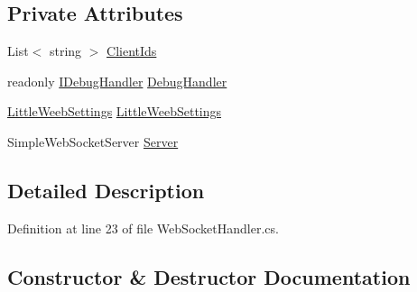 \subsection*{Private Attributes}
\begin{DoxyCompactItemize}
\item 
List$<$ string $>$ \mbox{\hyperlink{class_little_weeb_library_1_1_handlers_1_1_web_socket_handler_a019d083f8ea9b7ad625222d2311c5b26}{Client\+Ids}}
\item 
readonly \mbox{\hyperlink{interface_little_weeb_library_1_1_handlers_1_1_i_debug_handler}{I\+Debug\+Handler}} \mbox{\hyperlink{class_little_weeb_library_1_1_handlers_1_1_web_socket_handler_aa1474285fe938f284633c31403bf9edf}{Debug\+Handler}}
\item 
\mbox{\hyperlink{class_little_weeb_library_1_1_settings_1_1_little_weeb_settings}{Little\+Weeb\+Settings}} \mbox{\hyperlink{class_little_weeb_library_1_1_handlers_1_1_web_socket_handler_ace78703e1e323bb96f1f6941b7483a88}{Little\+Weeb\+Settings}}
\item 
Simple\+Web\+Socket\+Server \mbox{\hyperlink{class_little_weeb_library_1_1_handlers_1_1_web_socket_handler_a20ab6e2afd31971c72722e2680dc50ca}{Server}}
\end{DoxyCompactItemize}


\subsection{Detailed Description}


Definition at line 23 of file Web\+Socket\+Handler.\+cs.



\subsection{Constructor \& Destructor Documentation}
\mbox{\label{class_little_weeb_library_1_1_handlers_1_1_web_socket_handler_aa420f7ed35d16df6ef6f18bd0ab8fa3a}} 
